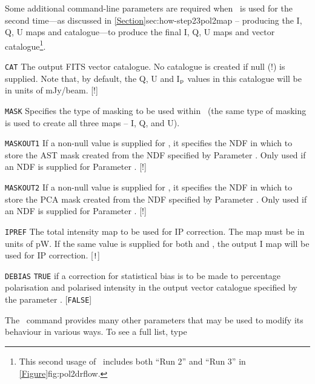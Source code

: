 Some additional command-line parameters are required when \poltwomap\ is
used for the second time---as discussed in
\cref{Section}{sec:how-step23}{pol2map -- producing the I, Q, U maps
and catalogue}---to produce the final I, Q, U maps and vector catalogue\footnote{This
second usage of \poltwomap\ includes both ``Run 2'' and ``Run 3'' in
\cref{Figure}{fig:pol2drflow}{}.}.

\begin{aligndesc}

\item[\texttt{CAT}] The output FITS vector catalogue. No catalogue is
  created if null (!) is supplied. Note that, by default, the Q, U and
  I$_{\textnormal{p}}$ values in this catalogue will be in units of mJy/beam. [!]

\item[\texttt{MASK}] Specifies the type of masking to be used within
  \makemap\ (the same type of masking is used to create all three maps --
  I, Q, and U).

\item[\texttt{MASKOUT1}] If a non-null value is supplied for ,
  it specifies the NDF in which to store the AST mask created from the NDF
  specified by Parameter . Only used if an NDF is supplied for
  Parameter . [!]

\item[\texttt{MASKOUT2}] If a non-null value is supplied for ,
  it specifies the NDF in which to store the PCA mask created from the NDF
  specified by Parameter . Only used if an NDF is supplied for
  Parameter . [!]

\item[\texttt{IPREF}] The total intensity map to be used for IP
  correction. The map must be in units of pW. If the same value is
  supplied for both  and , the output I
  map will be used for IP correction. [\texttt{!}]

\item[\texttt{DEBIAS}] \texttt{TRUE} if a correction for statistical bias is to
  be made to percentage polarisation and polarised intensity in the
  output vector catalogue specified by the parameter . [\texttt{FALSE}]
\end{aligndesc}

The \poltwomap\ command provides many other parameters that may be used to
modify its behaviour in various ways. To see a full list, type

